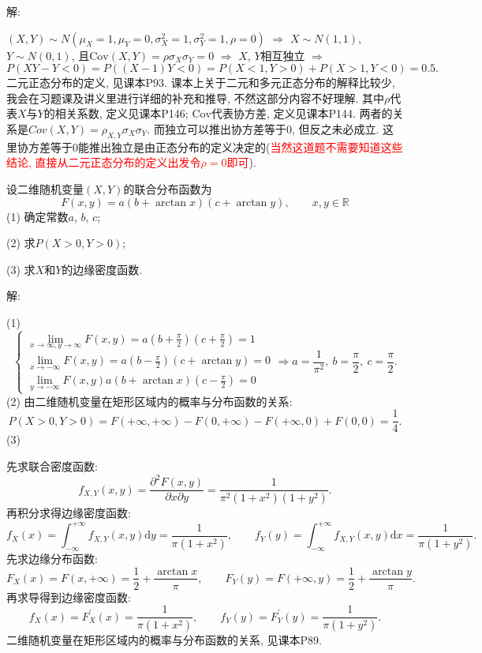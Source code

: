 \documentclass[standard]{ExBook}
\renewenvironment{shaded}{%
  \def\FrameCommand{\fboxsep=\FrameSep \colorbox{shadecolor}}%
  \MakeFramed{\advance\hsize-\width \FrameRestore}%
}{%
  \endMakeFramed
}
\begin{document}
\begin{qitems}
解: 

$(X,Y)\sim N(\mu_{X}=1,\mu_{Y}=0,\sigma_{X}^{2}=1,\sigma_{Y}^{2}=1,\rho=0)$ $\Longrightarrow$ $X\sim N(1,1)$, $Y\sim N(0,1)$, 且$\mathrm{Cov}(X,Y)=\rho\sigma_{X}\sigma_{Y}=0$ $\Longrightarrow$ $X$, $Y$相互独立 $\Longrightarrow$
$$P(XY-Y<0)=P((X-1)Y<0)=P(X<1,Y>0)+P(X>1,Y<0)=0.5.$$
\textcolor{themeColor}{\selectfont {} 二元正态分布的定义, 见课本P93. 课本上关于二元和多元正态分布的解释比较少, 我会在习题课及讲义里进行详细的补充和推导, 不然这部分内容不好理解. 其中$\rho$代表$X$与$Y$的相关系数, 定义见课本P146; $\mathrm{Cov}$代表协方差, 定义见课本P144. 两者的关系是$Cov(X,Y)=\rho_{X,Y}\sigma_{X}\sigma_{Y}$. 而独立可以推出协方差等于0, 但反之未必成立. 这里协方差等于0能推出独立是由正态分布的定义决定的(\textcolor{red}{当然这道题不需要知道这些结论, 直接从二元正态分布的定义出发令$\rho=0$即可}).}

\vspace{2.5cm-5em}

    \begin{bbox}
    \begin{shaded}
        \qitem
设二维随机变量$(X,Y)$的联合分布函数为
$$F(x,y)=a(b+\arctan x)(c+\arctan y),\qquad x,y\in\mathbb{R}$$
(1) 确定常数$a$, $b$, $c$;

(2) 求$P(X>0,Y>0)$;

(3) 求$X$和$Y$的边缘密度函数.
    \end{shaded}
    \end{bbox}

\vspace{\dimexpr2.5cm-5em\relax}

解: 

(1) 
$$
    \left\{
    \begin{array}{l}
        \lim\limits_{x\to\infty,y\to\infty}F(x,y)=a(b+\frac{\pi}{2})(c+\frac{\pi}{2})=1\\
        \lim\limits_{x\to-\infty}F(x,y)=a(b-\frac{\pi}{2})(c+\arctan y)=0\\
        \lim\limits_{y\to-\infty}F(x,y)a(b+\arctan x)(c-\frac{\pi}{2})=0
    \end{array}
    \right.
    \Longrightarrow
    a=\frac{1}{\pi^2},\ b=\frac{\pi}{2},\ c=\frac{\pi}{2}.
$$
(2) 由二维随机变量在矩形区域内的概率与分布函数的关系:
$$P(X>0,Y>0)=F(+\infty,+\infty)-F(0,+\infty)-F(+\infty,0)+F(0,0)=\frac{1}{4}.$$
(3)

 先求联合密度函数:
$$f_{X,Y}(x,y)=\frac{\partial^{2}F(x,y)}{\partial x\partial y}=\frac{1}{\pi^2(1+x^2)(1+y^2)}.$$
再积分求得边缘密度函数:
$$f_{X}(x)=\displaystyle\int_{-\infty}^{+\infty}f_{X,Y}(x,y)\mathrm{d}y=\frac{1}{\pi(1+x^2)},\qquad f_{Y}(y)=\displaystyle\int_{-\infty}^{+\infty}f_{X,Y}(x,y)\mathrm{d}x=\frac{1}{\pi(1+y^2)}.$$
 先求边缘分布函数:
$$F_{X}(x)=F(x,+\infty)=\frac{1}{2}+\frac{\arctan x}{\pi},\qquad F_{Y}(y)=F(+\infty,y)=\frac{1}{2}+\frac{\arctan y}{\pi}.$$
再求导得到边缘密度函数:
$$f_{X}(x)=F_{X}^{'}(x)=\frac{1}{\pi(1+x^2)}, \qquad f_{Y}(y)=F_{Y}^{'}(y)=\frac{1}{\pi(1+y^2)}.$$
\textcolor{themeColor}{\selectfont {} 二维随机变量在矩形区域内的概率与分布函数的关系, 见课本P89.}


\end{qitems}
\end{document}
